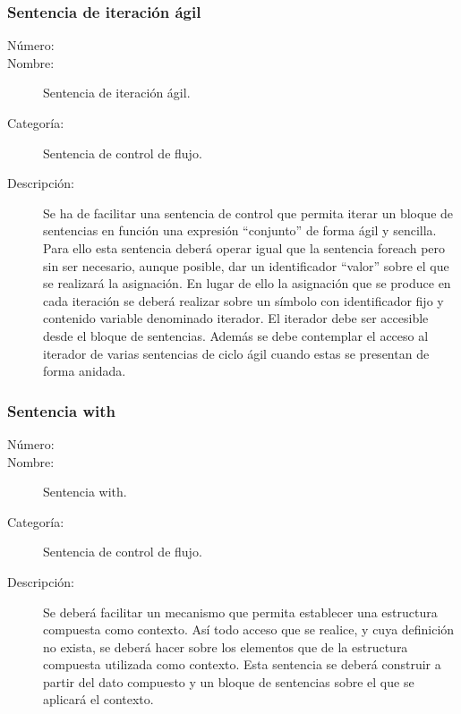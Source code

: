 \subsubsection{Sentencia de iteración ágil}
\begin{framed}
	\begin{description}
		\item [Número:] \cn
		\item [Nombre:] Sentencia de iteración ágil.
		\item [Categoría:] Sentencia de control de flujo.
		\item [Descripción:] Se ha de facilitar una sentencia de control que permita
		iterar un bloque de sentencias en función una expresión ``conjunto'' de forma ágil y sencilla.
		Para ello esta sentencia deberá operar igual que la sentencia foreach pero sin ser necesario, aunque posible,
		dar un identificador ``valor'' sobre el que se realizará la asignación. En lugar de ello la asignación que se produce
		en cada iteración se deberá realizar sobre un símbolo con identificador fijo y contenido variable denominado iterador.
		El iterador debe ser accesible desde el bloque de sentencias. Además se debe contemplar el acceso al iterador de 
      varias sentencias de ciclo ágil cuando estas se presentan de forma anidada. 
	\end {description}
\end{framed}

\subsubsection{Sentencia with}
\begin{framed}
	\begin{description}
		\item [Número:] \cn
		\item [Nombre:] Sentencia with.
		\item [Categoría:] Sentencia de control de flujo.
		\item [Descripción:] Se deberá facilitar un mecanismo que permita establecer una estructura compuesta como contexto. Así todo acceso que se
      realice, y cuya definición no exista, se deberá hacer sobre los elementos que de la estructura compuesta utilizada como contexto. 
      Esta sentencia se deberá construir a partir del dato compuesto y un bloque de sentencias sobre el que se aplicará el contexto.
	\end{description}
\end{framed}

